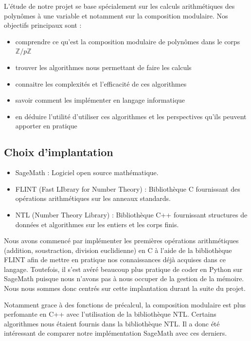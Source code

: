 \documentclass[a4paper]{article}
\begin{document}
L'étude de notre projet se base spécialement sur les calculs arithmétiques des polynômes à une variable et notamment sur la composition modulaire. Nos objectifs principaux sont :
\begin{itemize}
	\item comprendre ce qu'est la composition modulaire de polynômes dans le corps ${\mathbb{Z}/p \mathbb{Z}}$
	\item trouver les algorithmes nous permettant de faire les calculs 
	\item connaitre les complexités et l'efficacité de ces algorithmes
	\item savoir comment les implémenter en langage informatique 
	\item en déduire l'utilité d'utiliser ces algorithmes et les perspectives qu'ils peuvent apporter en pratique

\end{itemize}

\subsection{Choix d'implantation}

\begin{itemize}
    \item SageMath : Logiciel open source mathématique.
    \item FLINT (Fast LIbrary for Number Theory) : Bibliothèque C fournissant des opérations arithmétiques sur les anneaux standards.
    \item NTL (Number Theory Library) : Bibliothèque C++ fournissant structures de données et algorithmes sur les entiers et les corps finis.
\end{itemize}

Nous avons commencé par implémenter les premières opérations arithmétiques (addition, soustraction, division euclidienne) en C à l'aide de la bibliothèque FLINT afin de mettre en pratique nos connaissances déjà acquises dans ce langage.
Toutefois, il s'est avéré beaucoup plus pratique de coder en Python sur SageMath puisque nous n'avons pas à nous occuper de la gestion de la mémoire.
Nous nous sommes donc centrés sur cette implantation durant la suite du projet.

Notamment grace à des fonctions de précalcul, la composition modulaire est plus perfomante en C++ avec l'utilisation de la bibliothèque NTL.
Certains algorithmes nous étaient fournis dans la bibliothèque NTL. Il a donc été intéressant de comparer notre implémentation SageMath avec ces derniers.
\end{document}

